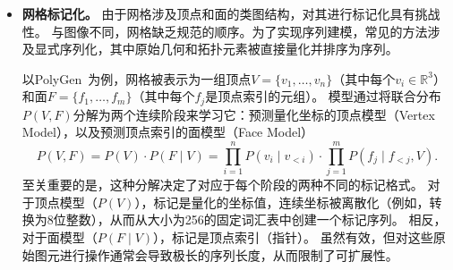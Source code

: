 \documentclass[../../book-main_zh.tex]{subfiles}
\begin{document}
\begin{itemize}



\item \textbf{网格标记化。}
由于网格涉及顶点和面的类图结构，对其进行标记化具有挑战性。
与图像不同，网格缺乏规范的顺序。为了实现序列建模，常见的方法涉及显式序列化，其中原始几何和拓扑元素被直接量化并排序为序列。



以PolyGen~\cite{nash2020polygen}为例，网格被表示为一组顶点$V = \{v_1, \dots, v_n\}$（其中每个$v_i \in \mathbb{R}^3$）和面$F = \{f_1, \dots, f_m\}$（其中每个$f_j$是顶点索引的元组）。
模型通过将联合分布$P(V, F)$分解为两个连续阶段来学习它：预测量化坐标的顶点模型（Vertex Model），以及预测顶点索引的面模型（Face Model）
\begin{equation}
    P(V, F) = P(V) \cdot P(F \mid V) = \prod_{i=1}^{n} P(v_i \mid v_{<i}) \cdot \prod_{j=1}^{m} P(f_j \mid f_{<j}, V).
\end{equation}
至关重要的是，这种分解决定了对应于每个阶段的两种不同的标记格式。
对于顶点模型（$P(V)$），标记是量化的坐标值，连续坐标被离散化（例如，转换为8位整数），从而从大小为256的固定词汇表中创建一个标记序列。
相反，对于面模型（$P(F \mid V)$），标记是顶点索引（指针）。
虽然有效，但对这些原始图元进行操作通常会导致极长的序列长度，从而限制了可扩展性。


\end{itemize}
\end{document}
